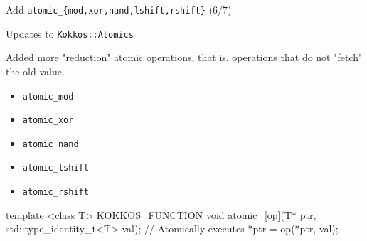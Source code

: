 
\begin{frame}[fragile]{Add \texttt{atomic\_\{mod,xor,nand,lshift,rshift\}} (6/7)}

Updates to \texttt{Kokkos::Atomics}

\vspace{10pt}

Added more "reduction" atomic operations, that is, operations that do not "fetch" the old value.
\begin{itemize}
  \item \texttt{atomic\_mod}
  \item \texttt{atomic\_xor}
  \item \texttt{atomic\_nand}
  \item \texttt{atomic\_lshift}
  \item \texttt{atomic\_rshift}
\end{itemize}

\vspace{5pt}

\begin{code}
template <class T>
KOKKOS_FUNCTION void atomic_[op](T* ptr, std::type_identity_t<T> val);
// Atomically executes { *ptr = op(*ptr, val); }
\end{code}

\end{frame}



